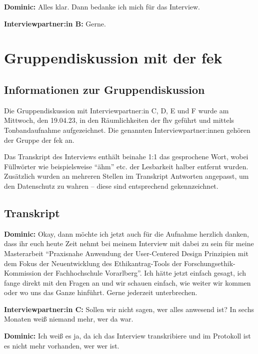 \documentclass[a4paper,12pt,twoside]{scrreprt}
\begin{document}
\textbf{Dominic:} Alles klar. Dann bedanke ich mich für das Interview.

\textbf{Interviewpartner:in B:} Gerne.

\cleardoublepage
\chapter{Gruppendiskussion mit der \acl{fek}}
\label{appendix:gruppendiskussion}

\section{Informationen zur Gruppendiskussion}
\label{appendix:gruppendiskussion-infos}

Die Gruppendiskussion mit Interviewpartner:in C, D, E und F wurde am Mittwoch, den 19.04.23, in den Räumlichkeiten der \ac{fhv} geführt und mittels Tonbandaufnahme aufgezeichnet. Die genannten Interviewpartner:innen gehören der Gruppe der \acl{fek} an.

Das Transkript des Interviews enthält beinahe 1:1 das gesprochene Wort, wobei Füllwörter wie beispielsweise \enquote{ähm} etc. der Lesbarkeit halber entfernt wurden. Zusätzlich wurden an mehreren Stellen im Transkript Antworten angepasst, um den Datenschutz zu wahren -- diese sind entsprechend gekennzeichnet.

\section{Transkript}
\label{appendix:gruppendiskussion-transkript}

\textbf{Dominic:} Okay, dann möchte ich jetzt auch für die Aufnahme herzlich danken, dass ihr euch heute Zeit nehmt bei meinem Interview mit dabei zu sein für meine Masterarbeit \enquote{Praxisnahe Anwendung der User-Centered Design Prinzipien mit dem Fokus der Neuentwicklung des Ethikantrag-Tools der Forschungsethik-Kommission der Fachhochschule Vorarlberg}. Ich hätte jetzt einfach gesagt, ich fange direkt mit den Fragen an und wir schauen einfach, wie weiter wir kommen oder wo uns das Ganze hinführt. Gerne jederzeit unterbrechen.

\textbf{Interviewpartner:in C:} Sollen wir nicht sagen, wer alles anwesend ist? In sechs Monaten weiß niemand mehr, wer da war.

\textbf{Dominic:} Ich weiß es ja, da ich das Interview transkribiere und im Protokoll ist es nicht mehr vorhanden, wer wer ist.
\end{document}
